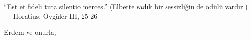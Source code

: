 \documentclass[UKenglish]{uioletter}
\date{Tarih}
\begin{document}
\begin{letter} {}
“Est et fideli tuta silentio merces.” (Elbette sadık bir sessizliğin de ödülü vardır.)
— Horatius, Övgüler III, 25-26
    \closing{Erdem ve onurla,}
\end{letter}
\end{document}
